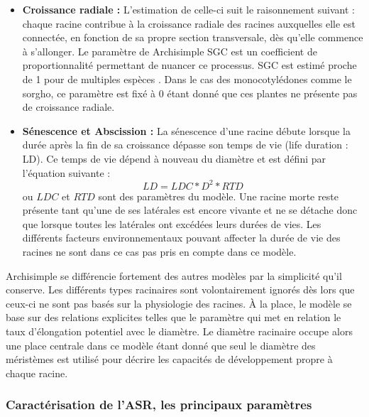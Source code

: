 \begin{itemize}
    \item \textbf{Croissance radiale :}
    L'estimation de celle-ci suit le raisonnement suivant :
    chaque racine contribue à la croissance radiale des racines auxquelles elle est connectée, en fonction de sa propre section transversale, dès qu'elle commence à s'allonger. 
    Le paramètre de Archisimple SGC est un coefficient de proportionnalité permettant de nuancer ce processus.
    SGC est estimé proche de 1 pour de multiples espèces \citep{pages_calibration_2014}.
    Dans le cas des monocotylédones comme le sorgho, ce paramètre est fixé à 0 étant donné que ces plantes ne présente pas de croissance radiale.
    \item \textbf{Sénescence et Abscission :}
    La sénescence d'une racine débute lorsque la durée après la fin de sa croissance dépasse son temps de vie (life duration : LD).
    Ce temps de vie dépend à nouveau du diamètre et est défini par l'équation suivante :
    \begin{equation} 
    LD=LDC*D^2*RTD 
    \label{eq:LD}
    \end{equation}
    ou $LDC$ et $RTD$ sont des paramètres du modèle.
    Une racine morte reste présente tant qu'une de ses latérales est encore vivante et ne se détache donc que lorsque toutes les latérales ont excédées leurs durées de vies.
    Les différents facteurs environnementaux pouvant affecter la durée de vie des racines ne sont dans ce cas pas pris en compte dans ce modèle.
\end{itemize}

Archisimple se différencie fortement des autres modèles par la simplicité qu'il conserve.
Les différents types racinaires sont volontairement ignorés dès lors que ceux-ci ne sont pas basés sur la physiologie des racines.
À la place, le modèle se base sur des relations explicites telles que le paramètre qui met en relation le taux d'élongation potentiel avec le diamètre.
Le diamètre racinaire occupe alors une place centrale dans ce modèle étant donné que seul le diamètre des méristèmes est utilisé pour décrire les capacités de développement propre à chaque racine.

\subsubsection{Caractérisation de l'ASR, les principaux paramètres}

